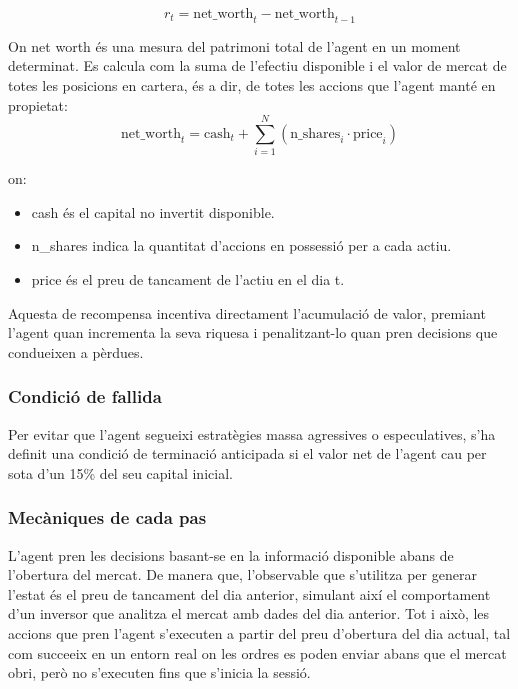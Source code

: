 \documentclass[12pt,a4paper,twoside]{book}
\begin{document}
\begin{equation}
r_t = \text{net\_worth}_t - \text{net\_worth}_{t-1}
\end{equation}


On net worth és una mesura del patrimoni total de l'agent en un moment determinat. Es calcula com la suma de l'efectiu disponible i el valor de mercat de totes les posicions en cartera, és a dir, de totes les accions que l'agent manté en propietat:
\begin{equation}
\text{net\_worth}_t = \text{cash}_t + \sum_{i=1}^{N} \left( \text{n\_shares}_i \cdot \text{price}_i \right)
\end{equation}

on:
\begin{itemize}
    \item cash és el capital no invertit disponible.
    \item n\_shares indica la quantitat d'accions en possessió per a cada actiu.
    \item price és el preu de tancament de l'actiu en el dia t.
\end{itemize}

Aquesta de recompensa incentiva directament l'acumulació de valor, premiant l'agent quan incrementa la seva riquesa i penalitzant-lo quan pren decisions que condueixen a pèrdues.

\subsubsection{Condició de fallida}

Per evitar que l'agent segueixi estratègies massa agressives o especulatives, s'ha definit una condició de terminació anticipada si el valor net de l'agent cau per sota d'un 15\% del seu capital inicial.

\subsubsection{Mecàniques de cada pas}

L'agent pren les decisions basant-se en la informació disponible abans de l'obertura del mercat. De manera que, l'observable que s'utilitza per generar l'estat és el preu de tancament del dia anterior, simulant així el comportament d'un inversor que analitza el mercat amb dades del dia anterior. Tot i això, les accions que pren l'agent s'executen a partir del preu d'obertura del dia actual, tal com succeeix en un entorn real on les ordres es poden enviar abans que el mercat obri, però no s'executen fins que s'inicia la sessió.
\end{document}
